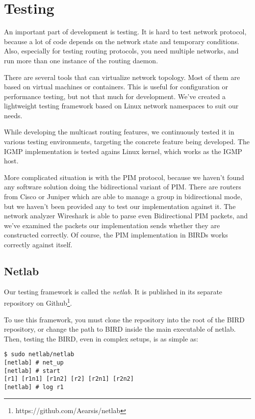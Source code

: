 \chapter{Testing}

An important part of development is testing. It is hard to test network
protocol, because a lot of code depends on the network state and temporary
conditions. Also, especially for testing routing protocols, you need multiple
networks, and run more than one instance of the routing daemon.

There are several tools that can virtualize network topology. Most of them are
based on virtual machines or containers. This is useful for configuration or
performance testing, but not that much for development. We've created
a lightweight testing framework based on Linux network namespaces to suit our
needs.

While developing the multicast routing features, we continuously tested it in
various testing environments, targeting the concrete feature being developed.
The IGMP implementation is tested agains Linux kernel, which works as the IGMP
host.

More complicated situation is with the PIM protocol, because we haven't
found any software solution doing the bidirectional variant of PIM. There are
routers from Cisco or Juniper which are able to manage a group in bidirectional
mode, but we haven't been provided any to test our implementation against it.
The network analyzer Wireshark is able to parse even Bidirectional PIM packets,
and we've examined the packets our implementation sends whether they are
constructed correctly. Of course, the PIM implementation in BIRDs works
correctly against itself.

\section{Netlab}
Our testing framework is called the \emph{netlab}. It is published in its
separate repository on Github\footnote{https://github.com/Aearsis/netlab}.

To use this framework, you must clone the repository into the root of the BIRD
repository, or change the path to BIRD inside the main executable of netlab.
Then, testing the BIRD, even in complex setups, is as simple as:

\begin{lstlisting}
$ sudo netlab/netlab
[netlab] # net_up
[netlab] # start
[r1] [r1n1] [r1n2] [r2] [r2n1] [r2n2] 
[netlab] # log r1
\end{lstlisting}

